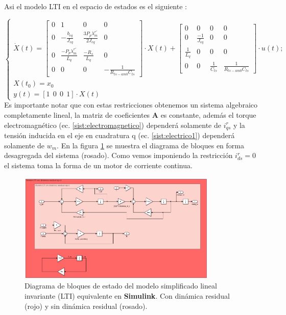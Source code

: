 \documentclass[10pt]{article}
\begin{document}
\begin{enumerate}
\begin{itemize}
	Asi el modelo LTI en el espacio de estados es el siguiente  :
	
	\begin{equation}
	\begin{cases}
	\dot{X}(t)=\begin{bmatrix}
	0 & 1 &0 &0\\ 
	0 & -\frac{b_{eq}}{J_{eq}} & \frac{3 P_{p} \lambda^{r'}_{m}}{2 J_{eq}} & 0\\ 
	0  & \frac{- P_{p} \lambda^{r'}_{m}}{ L_{q}} & \frac{-R_{s}}{L_{q}} & 0\\
	0 & 0 & 0 & -\frac{1}{R_{ts-amb} C_{ts}}
	\end{bmatrix}\cdot X(t) + \begin{bmatrix}
	0 &0 &0 &0\\ 
	0 &\frac{-1}{J_{eq}} &0 &0\\ 
	 \frac{1}{L_{q}}&0 &0 & 0\\
	0 & 0 & \frac{1}{C_{ts}} & \frac{1}{R_{ts-amb} C_{ts}}
	\end{bmatrix} 
	\cdot u(t); \\
	X(t_{0})=x_{0}\\ 
	y(t)=[1 \ \ 0 \ \ 0 \ \ 1] \cdot X(t)
	\end{cases}
	\label{eq:2.1.2.c.4}
	\end{equation}
	Es importante notar que con estas restricciones obtenemos un sistema algebraico completamente lineal, la matriz de coeficientes \textbf{A} es constante, además el torque electromagnético (ec. \ref{sist:electromagnetico}) dependerá solamente de $i^{r}_{qs}$ y la tensión inducida en el eje en cuadratura q (ec. \ref{sist:electrico1}) dependerá solamente de $w_{m}$.
	En la figura \ref{fig:diagLTI} se muestra el diagrama de bloques en forma desagregada del sistema (rosado). Como vemos imponiendo la restricción $i^{r}_{ds}=0$ el sistema toma la forma de un motor de corriente continua.
	\begin{figure}[h!]
		\centering
		\includegraphics[width=0.85\textwidth]{DiagramabloquesLTI.png}
		\caption{\label{fig:diagLTI} Diagrama de bloques de estado del modelo simplificado lineal invariante (LTI) equivalente en \textbf{Simulink}. Con dinámica residual (rojo) y sin dinámica residual (rosado). }
	\end{figure}


\end{itemize}
\end{enumerate}
\end{document}
